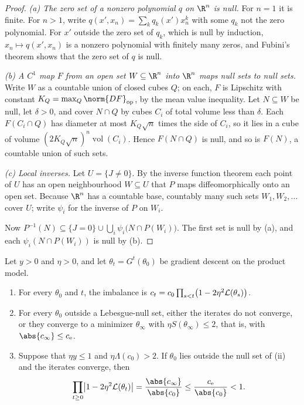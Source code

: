 \begin{refsection}
\begin{proof}
\emph{(a) The zero set of a nonzero polynomial $q$ on $\R^n$ is null.} For $n=1$ it is finite. For $n>1$, write $q(x',x_n)=\sum_kq_k(x')x_n^k$ with some $q_k$ not the zero polynomial. For $x'$ outside the zero set of $q_k$, which is null by induction, $x_n\mapsto q(x',x_n)$ is a nonzero polynomial with finitely many zeros, and Fubini's theorem shows that the zero set of $q$ is null.

\emph{(b) A $C^1$ map $F$ from an open set $W\subseteq\R^n$ into $\R^n$ maps null sets to null sets.} Write $W$ as a countable union of closed cubes $Q$; on each, $F$ is Lipschitz with constant $K_Q=\max_Q\norm{DF}_{\op}$, by the mean value inequality. Let $N\subseteq W$ be null, let $\delta>0$, and cover $N\cap Q$ by cubes $C_i$ of total volume less than $\delta$. Each $F(C_i\cap Q)$ has diameter at most $K_Q\sqrt n$ times the side of $C_i$, so it lies in a cube of volume $(2K_Q\sqrt n)^n\operatorname{vol}(C_i)$. Hence $F(N\cap Q)$ is null, and so is $F(N)$, a countable union of such sets.

\emph{(c) Local inverses.} Let $U=\{J\ne0\}$. By the inverse function theorem each point of $U$ has an open neighbourhood $W\subseteq U$ that $P$ maps diffeomorphically onto an open set. Because $\R^n$ has a countable base, countably many such sets $W_1,W_2,\dots$ cover $U$; write $\psi_i$ for the inverse of $P$ on $W_i$.

Now $P^{-1}(N)\subseteq\{J=0\}\cup\bigcup_i\psi_i\bigl(N\cap P(W_i)\bigr)$. The first set is null by (a), and each $\psi_i(N\cap P(W_i))$ is null by (b).
\end{proof}

\begin{theorem}\label{thm:stability:landing}
Let $y>0$ and $\eta>0$, and let $\theta_t=G^t(\theta_0)$ be gradient descent on the product model.
\begin{enumerate}
\item For every $\theta_0$ and $t$, the imbalance is $c_t=c_0\prod_{s<t}\bigl(1-2\eta^2\mathcal{L}(\theta_s)\bigr)$.
\item For every $\theta_0$ outside a Lebesgue-null set, either the iterates do not converge, or they converge to a minimizer $\theta_\infty$ with $\eta S(\theta_\infty)\le2$, that is, with $\abs{c_\infty}\le\stabce$.
\item Suppose that $\eta y\le1$ and $\eta\Lambda(c_0)>2$. If $\theta_0$ lies outside the null set of (ii) and the iterates converge, then
\[
  \prod_{t\ge0}\bigl\lvert1-2\eta^2\Loss(\theta_t)\bigr\rvert=\frac{\abs{c_\infty}}{\abs{c_0}}\le\frac{\stabce}{\abs{c_0}}<1 .
\]
\end{enumerate}
\end{theorem}


\end{refsection}
